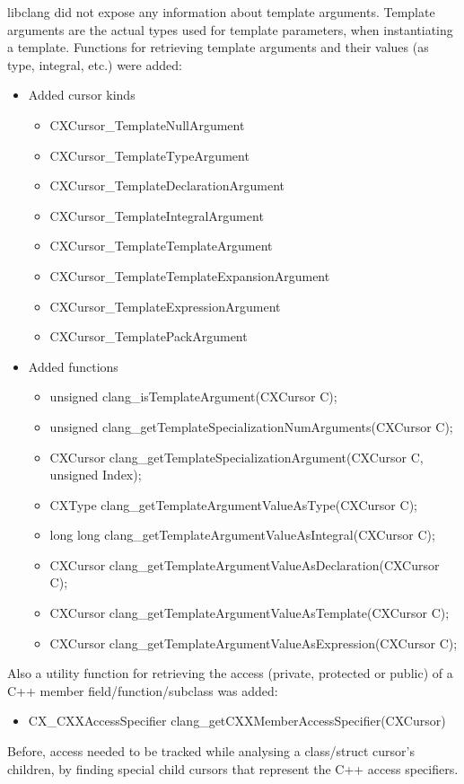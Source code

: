 libclang did not expose any information about template arguments. Template arguments are the actual types used for template parameters, when instantiating a template. Functions for retrieving template arguments and their values (as type, integral, etc.) were added:

\begin{itemize}\addtolength{\itemsep}{-0.5\baselineskip}
\item Added cursor kinds\begin{itemize}\addtolength{\itemsep}{-0.5\baselineskip}
	\item CXCursor\_TemplateNullArgument
	\item CXCursor\_TemplateTypeArgument
	\item CXCursor\_TemplateDeclarationArgument
	\item CXCursor\_TemplateIntegralArgument
	\item CXCursor\_TemplateTemplateArgument
	\item CXCursor\_TemplateTemplateExpansionArgument
	\item CXCursor\_TemplateExpressionArgument
	\item CXCursor\_TemplatePackArgument
	\end{itemize}
\item Added functions\begin{itemize}\addtolength{\itemsep}{-0.5\baselineskip}
	\item unsigned clang\_isTemplateArgument(CXCursor C);
	\item unsigned clang\_getTemplateSpecializationNumArguments(CXCursor C);
	\item CXCursor clang\_getTemplateSpecializationArgument(CXCursor C, unsigned Index);
	\item CXType clang\_getTemplateArgumentValueAsType(CXCursor C);
	\item long long clang\_getTemplateArgumentValueAsIntegral(CXCursor C);
	\item CXCursor clang\_getTemplateArgumentValueAsDeclaration(CXCursor C);
	\item CXCursor clang\_getTemplateArgumentValueAsTemplate(CXCursor C);
	\item CXCursor clang\_getTemplateArgumentValueAsExpression(CXCursor C);
	\end{itemize}
\end{itemize}

Also a utility function for retrieving the access (private, protected or public) of a C++ member field/function/subclass was added:
\begin{itemize}\addtolength{\itemsep}{-0.5\baselineskip}
\item CX\_CXXAccessSpecifier clang\_getCXXMemberAccessSpecifier(CXCursor)
\end{itemize}

Before, access needed to be tracked while analysing a class/struct cursor's children, by finding special child cursors that represent the C++ access specifiers.
